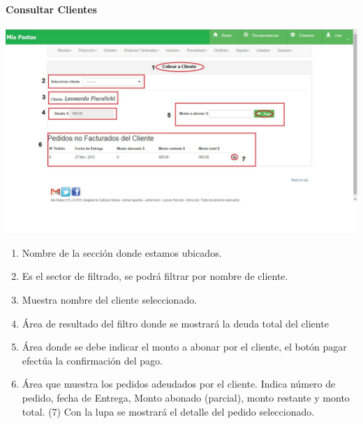 \documentclass[letterpaper,10pt,english]{sphinxmanual}
\begin{document}
\paragraph{{}Consultar Clientes}
\label{cobrarCliente consultarFiltrad::doc}\label{cobrarCliente consultarFiltrad:consultar-clientes}
\includegraphics{cobrar.jpg}
\begin{enumerate}
\item {} 
Nombre de la sección donde estamos ubicados.

\item {} 
Es el sector de filtrado, se podrá filtrar por nombre de cliente.

\item {} 
Muestra nombre del cliente seleccionado.

\item {} 
Área de resultado del filtro donde se mostrará la deuda total del cliente

\item {} 
Área donde se debe indicar el monto a abonar por el cliente, el botón pagar efectúa la confirmación del pago.

\item {} 
Área que muestra los pedidos adeudados por el cliente. Indica número de pedido, fecha de Entrega, Monto abonado (parcial), monto restante y monto total. (7) Con la lupa se mostrará el detalle del pedido seleccionado.

\end{enumerate}
\end{document}
